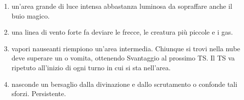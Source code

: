 \documentclass[itdr]{subfiles}
\begin{document}
\begin{enumerate}
	\item {} un'area grande di luce intensa abbastanza luminosa da sopraffare anche il buio magico.
	\item {} una linea di vento forte fa deviare le frecce, le creatura più piccole e i gas.
	\item {} vapori nauseanti riempiono un'area intermedia. Chiunque si trovi nella nube deve superare un  o vomita, ottenendo Svantaggio al prossimo TS. Il TS va ripetuto all'inizio di ogni turno in cui si sta nell'area.
	\item {} nasconde un bersaglio dalla \mbox{divinazione} e dallo scrutamento o confonde tali sforzi. \mbox{Persistente.}

\vfill
\break


\end{enumerate}
\end{document}
